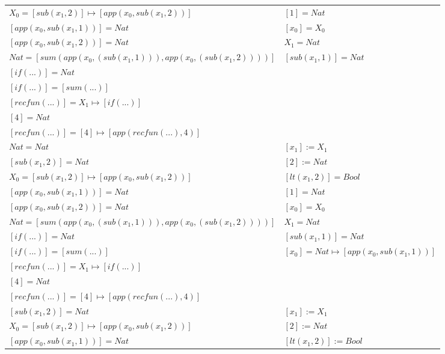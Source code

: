 \begin{exercise}
\begin{description}
\begin{center}
\begin{longtable}{ | l | l | }
                        $X_0 = [sub(x_1,2)] \mapsto [app(x_0, sub(x_1,2))]$ &  $[1] = Nat$ \\
                        $[app(x_0, sub(x_1,1))] = Nat$ & $[x_0] = X_0$ \\
                        $[app(x_0, sub(x_1,2))] = Nat$ & $X_1 = Nat$ \\
                        $Nat = [sum(app(x_0, (sub(x_1,1))), app(x_0, (sub(x_1,2))))]$ &  $[sub(x_1,1)] = Nat$\\
                        $[if(...)] = Nat$ & \\
                        $[if(...)] = [sum(...)]$ & \\
                        $[recfun(...)] = X_1 \mapsto [if(...)]$ & \\
                        $[4] = Nat$ & \\
                        $[recfun(...)] = [4] \mapsto [app(recfun(...), 4)]$ & \\
                    \hline
                        $Nat = Nat$ & $[x_1] := X_1$ \\
                        $[sub(x_1,2)] = Nat$ & $[2] := Nat$ \\
                        $X_0 = [sub(x_1,2)] \mapsto [app(x_0, sub(x_1,2))]$ & $[lt(x_1 , 2)] = Bool$ \\
                        $[app(x_0, sub(x_1,1))] = Nat$ & $[1] = Nat$ \\
                        $[app(x_0, sub(x_1,2))] = Nat$ & $[x_0] = X_0$ \\
                        $Nat = [sum(app(x_0, (sub(x_1,1))), app(x_0, (sub(x_1,2))))]$ & $X_1 = Nat$ \\
                        $[if(...)] = Nat$ & $[sub(x_1,1)] = Nat$ \\
                        $[if(...)] = [sum(...)]$ & $[x_0] = Nat \mapsto [app(x_0, sub(x_1,1))]$ \\
                        $[recfun(...)] = X_1 \mapsto [if(...)]$ & \\
                        $[4] = Nat$ & \\
                        $[recfun(...)] = [4] \mapsto [app(recfun(...), 4)]$ & \\
                    \hline
                        $[sub(x_1,2)] = Nat$ & $[x_1] := X_1$ \\
                        $X_0 =  [sub(x_1,2)] \mapsto [app(x_0, sub(x_1,2))]$ & $[2] := Nat$ \\
                        $[app(x_0, sub(x_1,1))] = Nat$ & $[lt(x_1 , 2)] := Bool$ \\

\end{longtable}
\end{center}
\end{description}
\end{exercise}
